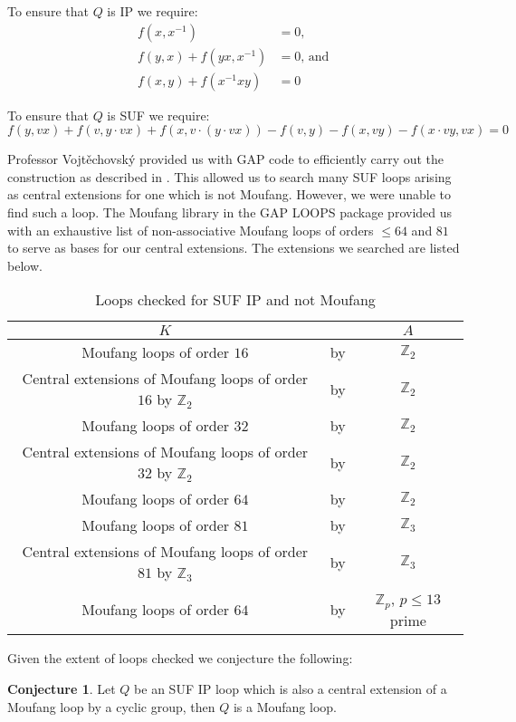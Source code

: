 \documentclass[12pt, twoside, openright]{report}
\theoremstyle{definition}
\newtheorem{cnj}[thm]{Conjecture}
\newcommand{\ZZZ}{\mathbb{Z}}
\begin{document}
To ensure that $Q$ is IP we require:
  \begin{align*}
    f(x, x^{-1}) &= 0,\\
    f(y, x) + f(yx, x^{-1}) &= 0\text{, and }\\
    f(x, y) + f(x^{-1} xy) &= 0
  \end{align*}

To ensure that $Q$ is SUF we require:
\[f(y, vx) + f(v, y\cdot vx) + f(x, v\cdot(y\cdot vx)) - f(v, y) - f(x, vy) - f(x\cdot vy, vx) = 0\]

Professor Vojt\v{e}chovsk\'{y} provided us with GAP code to efficiently carry out the construction
as described in \cite{64and81}. This allowed us to search many SUF loops arising as central extensions
for one which is not Moufang. However, we were unable to find such a loop. The Moufang library in the
GAP LOOPS package provided us with an exhaustive list of non-associative Moufang loops of orders
$\leq 64$ and $81$ to serve as bases for our central extensions. The extensions we searched are listed below.

\begin{table}[H]
  \centering
  \begin{tabular}{c|c|c}
    $K$ &  & $A$\\
    \hline
    Moufang loops of order $16$ & by & $\ZZZ_2$\\
    Central extensions of Moufang loops of order $16$ by $\ZZZ_2$ & by & $\ZZZ_2$\\
    Moufang loops of order $32$ & by & $\ZZZ_2$\\
    Central extensions of Moufang loops of order $32$ by $\ZZZ_2$ & by & $\ZZZ_2$\\
    Moufang loops of order $64$ & by & $\ZZZ_2$\\
    Moufang loops of order $81$ & by & $\ZZZ_3$\\
    Central extensions of Moufang loops of order $81$ by $\ZZZ_3$ & by & $\ZZZ_3$\\
    Moufang loops of order $64$ & by & $\ZZZ_p$, $p \leq 13$ prime
  \end{tabular}
  \caption{Loops checked for SUF IP and not Moufang}
\end{table}

Given the extent of loops checked we conjecture the following:

\begin{cnj}
  Let $Q$ be an SUF IP loop which is also a central extension of a Moufang loop by a cyclic group,
    then $Q$ is a Moufang loop.
\end{cnj}
\end{document}
